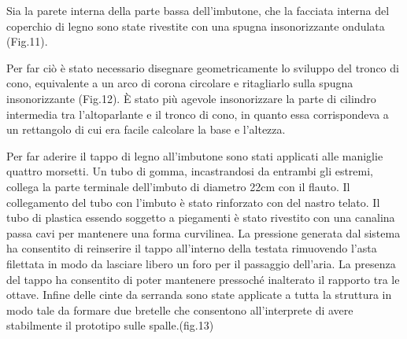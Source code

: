 Sia la parete interna della parte bassa dell’imbutone, che la facciata interna del coperchio di legno sono state rivestite con una spugna insonorizzante ondulata (Fig.11).

Per far ciò è stato necessario disegnare geometricamente lo sviluppo del tronco di cono, equivalente a un arco di corona circolare e ritagliarlo sulla spugna insonorizzante (Fig.12). È stato più agevole insonorizzare la parte di cilindro intermedia tra l’altoparlante e il tronco di cono, in quanto essa corrispondeva a un rettangolo di cui era facile calcolare la base e l’altezza.

Per far aderire il tappo di legno all’imbutone sono stati applicati alle maniglie quattro morsetti.
Un tubo di gomma, incastrandosi da entrambi gli estremi, collega la parte terminale dell’imbuto di diametro 22cm con il flauto. Il collegamento del tubo con l’imbuto è stato rinforzato con del nastro telato. Il tubo di plastica essendo soggetto a piegamenti è stato rivestito con una canalina passa cavi per mantenere una forma curvilinea.
La pressione generata dal sistema ha consentito di reinserire il tappo all’interno della testata  rimuovendo l’asta filettata  in modo da lasciare libero un foro per il passaggio dell’aria. La presenza del tappo ha consentito di poter mantenere pressoché inalterato  il rapporto tra le ottave.
Infine delle cinte da serranda sono state applicate a tutta la struttura in modo tale da formare due bretelle che consentono all’interprete di avere stabilmente il prototipo sulle spalle.(fig.13)
